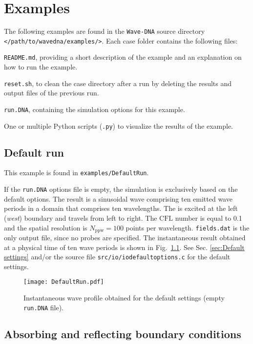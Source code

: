 \chapter{Examples}
\label{chap:Examples}

The following examples are found in the {\tt Wave-DNA} source directory {\tt </path/to/wavedna/examples/>}. Each case folder  contains the following files:
\begin{compactitem}
    \item {\tt README.md}, providing a short description of the example and an explanation on how to run the example.
    \item {\tt reset.sh}, to clean the case directory after a run by deleting the results and output files of the previous run.
    \item {\tt run.DNA}, containing the simulation options for this example.
    \item One or multiple Python scripts ({\tt *.py}) to visualize the results of the example.
\end{compactitem}

\section{Default run}
\label{sec:defaultrun}

This example is found in {\tt examples/DefaultRun}.

If the {\tt run.DNA} options file is empty, the simulation is exclusively based on the default options. The result is a sinusoidal wave comprising ten emitted wave periods in a domain that comprises ten wavelengths. The is excited at the left (\textit{west}) boundary and travels from left to right. The $\mathrm{CFL}$ number is equal to 0.1 and the spatial resolution is $N_{\mathrm{ppw}}=100$ points per wavelength. {\tt fields.dat} is the only output file, since no probes are specified. The instantaneous result obtained at a physical time of ten wave periods is shown in Fig.~\ref{fig:DefaultRun}. See Sec. \ref{sec:Default settings} and/or the source file {\tt src/io/iodefaultoptions.c} for the default settings.

\begin{figure}[t]
    \centering
    {\texttt{[image: DefaultRun.pdf]}}
    \caption{Instantaneous wave profile obtained for the default settings (empty {\tt run.DNA} file).}
    \label{fig:DefaultRun}
\end{figure}


\section{Absorbing and reflecting boundary conditions}

